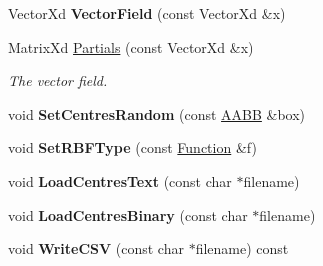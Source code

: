 \begin{DoxyCompactItemize}
\item 
\hypertarget{struct_d_r_d_s_p_1_1_model_r_b_f_a368c91d7df8ea3c0183dac748526e44c}{Vector\-Xd {\bfseries Vector\-Field} (const Vector\-Xd \&x)}\label{struct_d_r_d_s_p_1_1_model_r_b_f_a368c91d7df8ea3c0183dac748526e44c}

\item 
\hypertarget{struct_d_r_d_s_p_1_1_model_r_b_f_a926c68bffcc90d16e5000659846e7a61}{Matrix\-Xd \hyperlink{struct_d_r_d_s_p_1_1_model_r_b_f_a926c68bffcc90d16e5000659846e7a61}{Partials} (const Vector\-Xd \&x)}\label{struct_d_r_d_s_p_1_1_model_r_b_f_a926c68bffcc90d16e5000659846e7a61}

\begin{DoxyCompactList}\small\item\em The vector field. \end{DoxyCompactList}\item 
\hypertarget{struct_d_r_d_s_p_1_1_model_r_b_f_a09e9a5e98036cdc2afa0efeee79120fe}{void {\bfseries Set\-Centres\-Random} (const \hyperlink{struct_d_r_d_s_p_1_1_a_a_b_b}{A\-A\-B\-B} \&box)}\label{struct_d_r_d_s_p_1_1_model_r_b_f_a09e9a5e98036cdc2afa0efeee79120fe}

\item 
\hypertarget{struct_d_r_d_s_p_1_1_model_r_b_f_a5e71e8da6a59afb2e84a5474c4eafc15}{void {\bfseries Set\-R\-B\-F\-Type} (const \hyperlink{struct_d_r_d_s_p_1_1_function}{Function} \&f)}\label{struct_d_r_d_s_p_1_1_model_r_b_f_a5e71e8da6a59afb2e84a5474c4eafc15}

\item 
\hypertarget{struct_d_r_d_s_p_1_1_model_r_b_f_ad08c2b2bb4ef5e2568b864d07a881591}{void {\bfseries Load\-Centres\-Text} (const char $\ast$filename)}\label{struct_d_r_d_s_p_1_1_model_r_b_f_ad08c2b2bb4ef5e2568b864d07a881591}

\item 
\hypertarget{struct_d_r_d_s_p_1_1_model_r_b_f_a5fba4f6a427ec8359e81926aa9e4a58d}{void {\bfseries Load\-Centres\-Binary} (const char $\ast$filename)}\label{struct_d_r_d_s_p_1_1_model_r_b_f_a5fba4f6a427ec8359e81926aa9e4a58d}

\item 
\hypertarget{struct_d_r_d_s_p_1_1_model_r_b_f_a04accc1f2dfafb57beef56fb8f845b48}{void {\bfseries Write\-C\-S\-V} (const char $\ast$filename) const }\label{struct_d_r_d_s_p_1_1_model_r_b_f_a04accc1f2dfafb57beef56fb8f845b48}

\end{DoxyCompactItemize}
